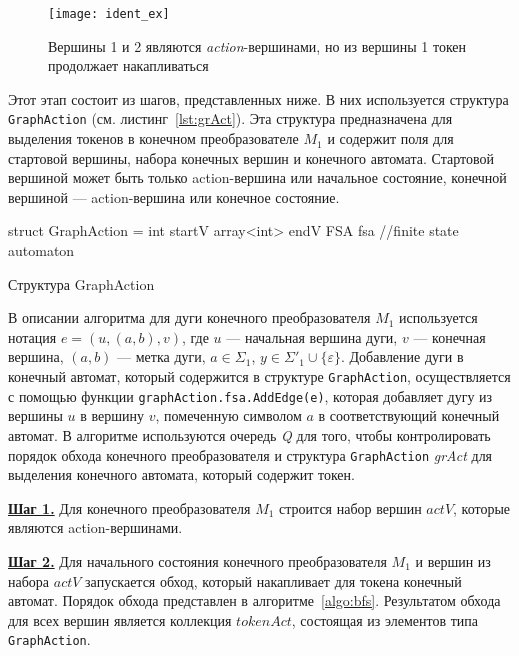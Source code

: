 \documentclass[10pt, conference, compsocconf]{IEEEtran}
\begin{document}
\begin{figure}[!t]
\centering
\texttt{[image: ident\_ex]}
\caption{Вершины 1 и 2 являются \textit{action}-вершинами, но из вершины 1 токен продолжает накапливаться}
\label{fig:ident_ex}
\end{figure}

Этот этап состоит из шагов, представленных ниже. В них используется структура \verb|GraphAction| (см. листинг~\ref{lst:grAct}). Эта структура предназначена для выделения токенов в конечном преобразователе $M_1$ и содержит поля для стартовой вершины, набора конечных вершин и конечного автомата. Стартовой вершиной может быть только action-вершина или начальное состояние, конечной вершиной --- action-вершина или конечное состояние. 

\begin{listing}[h]
\begin{pyglist}[language=csharp,numbers=none,numbersep=5pt]
struct GraphAction =
    int startV  
    array<int> endV
    FSA fsa  //finite state automaton
\end{pyglist}
\caption{Структура GraphAction}
\label{lst:grAct}
\end{listing}

В описании алгоритма для дуги конечного преобразователя $M_1$ используется нотация $e = (u, (a, b), v)$, где $u$ --- начальная вершина дуги, $v$ --- конечная вершина, $(a, b)$ --- метка дуги, $a \in \Sigma_1$, $y \in \Sigma'_1 \cup \{\varepsilon \}$.  Добавление дуги в конечный автомат, который содержится в структуре \verb|GraphAction|, осуществляется с помощью функции \verb|graphAction.fsa.AddEdge(e)|, которая добавляет дугу из вершины $u$ в вершину $v$, помеченную символом $a$ в соответствующий конечный автомат. В алгоритме используются очередь \textit{Q} для того, чтобы контролировать порядок обхода конечного преобразователя и структура \verb|GraphAction| \textit{grAct} для выделения конечного автомата, который содержит токен. 

\textbf{\underline{Шаг 1.}} Для конечного преобразователя $M_1$ строится набор вершин $actV$, которые являются action-вершинами. 

\textbf{\underline{Шаг 2.}} Для начального состояния конечного преобразователя $M_1$ и вершин из набора $actV$ запускается обход, который накапливает для токена конечный автомат. Порядок обхода представлен в алгоритме~\ref{algo:bfs}. Результатом обхода для всех вершин является коллекция $tokenAct$, состоящая из элементов типа \verb|GraphAction|.
\end{document}
